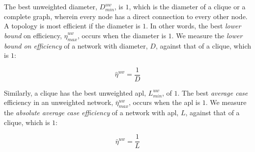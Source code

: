 \documentclass[10pt]{article}
\begin{document}
The best unweighted diameter, $D_{min}^{uw}$, is $1$, which is the diameter of a clique or a complete graph, wherein every node has a direct connection to every other node. %
A topology is most efficient if the diameter is $1$. %
In other words, the best \textit{lower bound} on efficiency, $\hat{\eta}_{max}^{uw}$, occurs when the diameter is $1$.%
We measure the %
\textit{lower bound on efficiency} of a network with diameter, $D$, against that of a clique, which is $1$:

\[\hat{\eta}^{uw} = \frac{1}{D}\]



Similarly, %
a clique has the best unweighted apl, $L_{min}^{uw}$, of $1$. %
The best \textit{average case} efficiency in an unweighted network, $\bar{\eta}_{max}^{uw}$, occurs when the apl is $1$. %
We measure the \textit{absolute average case efficiency} of a network with apl, $L$, against that of a clique, which is $1$:

\[\bar{\eta}^{uw} = \frac{1}{L}\]





%

\end{document}
